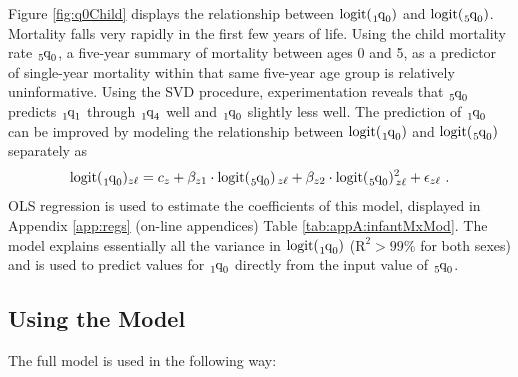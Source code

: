 \documentclass[11pt]{article}
\newcommand{\qf}{\tensor*[_5]{\mbox{q}}{_0}}
\newcommand{\qoz}{\tensor*[_1]{\mbox{q}}{_0}}
\newcommand{\qoo}{\tensor*[_1]{\mbox{q}}{_1}}
\newcommand{\qof}{\tensor*[_1]{\mbox{q}}{_4}}
\newcommand{\logit}{\mbox{logit}}
\begin{document}
Figure \ref{fig:q0Child} displays the relationship between $\logit(\qoz)$ and $\logit(\qf)$.  Mortality falls very rapidly in the first few years of life.  Using the child mortality rate $\qf$, a five-year summary of mortality between ages 0 and 5, as a predictor of single-year mortality within that same five-year age group is relatively uninformative.  Using the SVD procedure, experimentation reveals that $\qf$ predicts $\qoo$ through $\qof$ well and $\qoz$ slightly less well.  The prediction of $\qoz$ can be improved by modeling the relationship between $\logit(\qoz)$ and $\logit(\qf)$ separately as 
\begin{align}
\logit(\qoz)_{z\ell} = c_z + \beta_{z1} \cdot \logit(\qf)_{\, z\ell} + \beta_{z2} \cdot \logit(\qf)^2_{\, z\ell} + \epsilon_{z\ell} \ . \label{eqn:q0Cm}
\end{align}
OLS regression is used to estimate the coefficients of this model, displayed in Appendix \ref{app:regs} (on-line appendices) Table \ref{tab:appA:infantMxMod}.  The model explains essentially all the variance in $\logit(\qoz)$ ($\mbox{R}^2 > 99\%$ for both sexes) and is used to predict values for $\qoz$ directly from the input value of $\qf$.

\subsection{Using the Model}

The full model is used in the following way:
\end{document}
